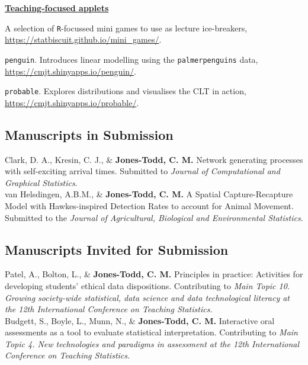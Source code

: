 \documentclass[10pt,a4paper]{moderncv}
\begin{document}
\underline{\textbf{Teaching-focused applets}}\\
\vspace{-3pt}

A selection of \texttt{R}-focussed mini games to use as lecture ice-breakers, \url{https://statbiscuit.github.io/mini_games/}.\\

\vspace{-3pt}

\texttt{penguin}. Introduces linear modelling using the \texttt{palmerpenguins} data, \url{https://cmjt.shinyapps.io/penguin/}.\\

\vspace{-3pt}

\texttt{probable}. Explores distributions and visualises the CLT in action, \url{https://cmjt.shinyapps.io/probable/}.\\

\subsection{Manuscripts in Submission}

Clark, D. A., Kresin, C. J., \&  \textbf{Jones-Todd, C. M.} Network generating processes with self-exciting arrival times. Submitted to \textit{Journal of Computational and Graphical Statistics}.\\

 van Helsdingen, A.B.M., \& \textbf{Jones-Todd, C. M.} A Spatial Capture-Recapture Model with Hawkes-inspired Detection Rates to account for Animal Movement. Submitted to the \textit{Journal of Agricultural, Biological and Environmental Statistics}.\\

\subsection{Manuscripts Invited for Submission}

Patel, A., Bolton, L., \& \textbf{Jones-Todd, C. M.} Principles in practice: Activities for developing students' ethical data dispositions. Contributing to \textit{Main Topic 10. Growing society-wide statistical, data science and data technological literacy at the 12th International Conference on Teaching Statistics.}\\

Budgett, S., Boyle, L., Munn, N.,  \& \textbf{Jones-Todd, C. M.} Interactive oral assessments as a tool to evaluate statistical interpretation. Contributing to \textit{Main Topic 4. New technologies and paradigms in assessment at the 12th International Conference on Teaching Statistics.}\\
\end{document}
